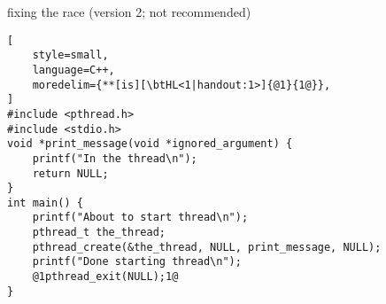 \begin{frame}[fragile,label=fixRace2]{fixing the race (version 2; not recommended)}
\begin{lstlisting}[
    style=small,
    language=C++,
    moredelim={**[is][\btHL<1|handout:1>]{@1}{1@}},
]
#include <pthread.h>
#include <stdio.h>
void *print_message(void *ignored_argument) {
    printf("In the thread\n");
    return NULL;
}
int main() {
    printf("About to start thread\n");
    pthread_t the_thread;
    pthread_create(&the_thread, NULL, print_message, NULL);
    printf("Done starting thread\n");
    @1pthread_exit(NULL);1@
}
\end{lstlisting}
\end{frame}

